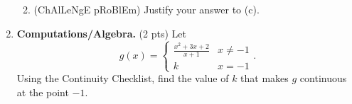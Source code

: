 \documentclass[11pt,letterpaper]{article}
\begin{document}
\begin{enumerate}
\begin{enumerate}
\vspace{0.5pc}
\item (ChAlLeNgE pRoBlEm) Justify your answer to (c).

\vspace{0.5pc}
\vspace{3.6pc}
\end{enumerate}

\vspace{1pc}
\item \textbf{Computations/Algebra.} (2 pts) Let 
\[g(x)=\begin{cases}\frac{x^2+3x+2}{x+1} & x\neq -1 \\
	k & x=-1 
    \end{cases}.\]
Using the Continuity Checklist, find the value of $k$ that makes $g$ continuous at the point $-1$.  

\vspace{1pc}

\end{enumerate}
\end{document}
